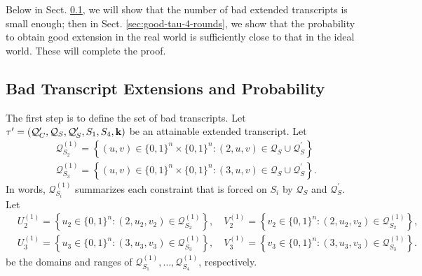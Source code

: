 Below in Sect. \ref{sec:bad-tau-4-rounds}, we will show that the number of bad extended transcripts is small enough; then in Sect. \ref{sec:good-tau-4-rounds}, we show that the probability to obtain good extension in the real world is sufficiently close to that in the ideal world. These will complete the proof.




\subsection{Bad Transcript Extensions and Probability}
\label{sec:bad-tau-4-rounds}

The first step is to define the set of bad transcripts. Let $\tau'=(\mathcal{Q}_{C}',\mathcal{Q}_{S},\mathcal{Q}_{S}',S_1,S_4,\mathbf{k})$ be an attainable extended transcript. Let
%
$$
\begin{aligned}
&\mathcal{Q}_{S_2}^{(1)}=\left\{(u, v) \in\{0,1\}^{n} \times\{0,1\}^{n}:(2, u, v) \in \mathcal{Q}_{S} \cup \mathcal{Q}_{S}^{\prime}\right\}\\
&\mathcal{Q}_{S_3}^{(1)}=\left\{(u, v) \in\{0,1\}^{n} \times\{0,1\}^{n}:(3, u, v) \in \mathcal{Q}_{S} \cup \mathcal{Q}_{S}^{\prime}\right\}.
\end{aligned}
$$
%
In words, $\mathcal{Q}_{S_{i}}^{(1)}$ summarizes each constraint that is forced on $S_{i}$ by $\mathcal{Q}_{S}$ and $\mathcal{Q}_{S}^{\prime}$. Let        {\small
%
$$
\begin{aligned}
&U_2^{(1)}=\left\{u_2 \in\{0,1\}^{n}:\left(2, u_2, v_2\right) \in \mathcal{Q}_{S_2}^{(1)}\right\}, \quad V_2^{(1)}=\left\{v_2 \in\{0,1\}^{n}:\left(2, u_2, v_2\right) \in \mathcal{Q}_{S_2}^{(1)}\right\},\\
&U_3^{(1)}=\left\{u_3 \in\{0,1\}^{n}:\left(3, u_3, v_3\right) \in \mathcal{Q}_{S_3}^{(1)}\right\}, \quad V_3^{(1)}=\left\{v_3 \in\{0,1\}^{n}:\left(3, u_3, v_3\right) \in \mathcal{Q}_{S_3}^{(1)}\right\}.
\end{aligned}
$$
}%
%
be the domains and ranges of $\mathcal{Q}_{S_{1}}^{(1)},\ldots,\mathcal{Q}_{S_{4}}^{(1)}$, respectively.




